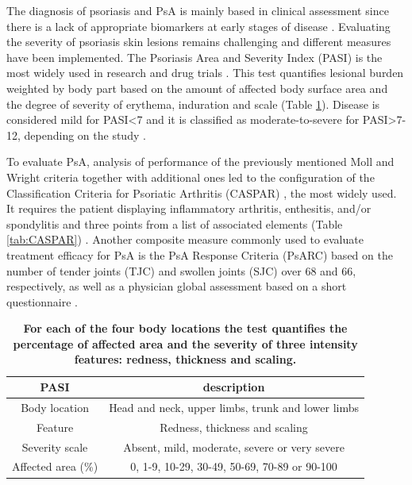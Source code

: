 The diagnosis of psoriasis and PsA is mainly based in clinical assessment since there is a lack of appropriate biomarkers at early stages of disease \parencite{Villanova2013}. Evaluating the severity of psoriasis skin lesions remains challenging and different measures have been implemented. The Psoriasis Area and Severity Index (PASI) \parencite{Fredriksson1978} is the most widely used in research and drug trials \parencite{Finlay2005}. This test quantifies lesional burden weighted by body part based on the amount of affected body surface area and the degree of severity of erythema, induration and scale (Table \ref{tab:PASI}). Disease is considered mild for PASI<7 and it is classified as moderate-to-severe for PASI>7-12, depending on the study \parencite{Finlay2005, Schmitt2005,add ref from cell types}.

To evaluate PsA, analysis of performance of the previously mentioned Moll and Wright criteria together with additional ones led to the configuration of the Classification Criteria for Psoriatic Arthritis (CASPAR) \parencite {Taylor2006}, the most widely used. It requires the patient displaying inflammatory arthritis, enthesitis, and/or spondylitis and three points from a list of associated elements (Table \ref{tab:CASPAR}) . Another composite measure commonly used to evaluate treatment efficacy for PsA is the PsA Response Criteria (PsARC) based on the number of tender joints (TJC) and swollen joints (SJC) over 68 and 66, respectively, as well as a physician global assessment based on a short questionnaire \parencite{Philipp2011,Clegg1996}.


\begin{table}[htbp]
\setlength{\tabcolsep}{20pt}
\renewcommand{\arraystretch}{1.5}
\begin{tabular}{@{} c c}
\textbf{PASI} & \textbf{description} \\
\midrule
\midrule
Body location  & Head and neck, upper limbs, trunk and lower limbs\\
Feature        & Redness, thickness and scaling \\
Severity scale & Absent, mild, moderate, severe or very severe \\
Affected area (\%)  & 0, 1-9, 10-29, 30-49, 50-69, 70-89 or 90-100 \\
\bottomrule
\end{tabular}
\medskip %
\caption[Variables and scoring used in the Psoriasis Area and Severity Index (PASI)]{\textbf{For each of the four body locations the test quantifies the percentage of affected area and the severity of three intensity features: redness, thickness and scaling.}}
\label{tab:PASI}
\end{table}
\bigskip %





